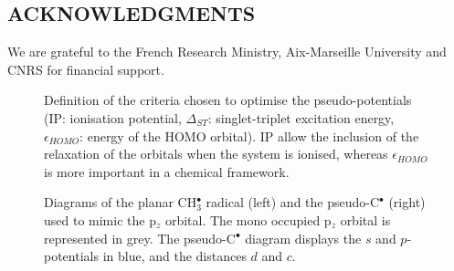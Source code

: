 \documentclass[12pt]{article}
\begin{document}
\subsection*{\sffamily \large ACKNOWLEDGMENTS}
We are grateful to the French Research Ministry, Aix-Marseille University and CNRS for financial support.

\clearpage



%
%



\clearpage

\begin{figure}
\caption{Definition of the criteria chosen to optimise the pseudo-potentials
(IP: ionisation potential, $\Delta_{ST}$: singlet-triplet excitation energy, $\epsilon_{HOMO}$: energy of the HOMO orbital).
IP allow the inclusion of the relaxation of the orbitals when the system is ionised, whereas $\epsilon_{HOMO}$ is more important
in a chemical framework.}
\label{figure:diagram}
\end{figure}

\begin{figure}
\caption{Diagrams of the planar CH\(^{\bullet}_{3}\) radical (left) and the pseudo-C\(^{\bullet}\) (right)
used to mimic the p$_z$ orbital.
The mono occupied p$_z$ orbital is represented in grey.
The pseudo-C\(^{\bullet}\) diagram displays the \(s\) and \(p\)-potentials in blue,
and the distances \(d\) and \(c\).}
\label{figure:ref_pseudo_diagram}
\end{figure}
\end{document}
